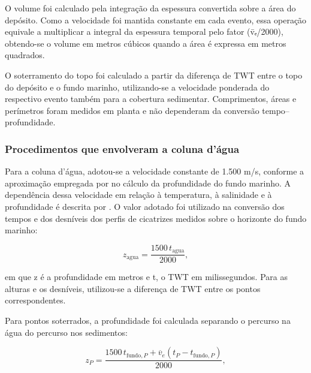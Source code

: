 O volume foi calculado pela integração da espessura convertida sobre a área do depósito. Como a velocidade foi mantida constante em cada evento, essa operação equivale a multiplicar a integral da espessura temporal pelo fator (v̄ₑ/2000), obtendo-se o volume em metros cúbicos quando a área é expressa em metros quadrados.

O soterramento do topo foi calculado a partir da diferença de TWT entre o topo do depósito e o fundo marinho, utilizando-se a velocidade ponderada do respectivo evento também para a cobertura sedimentar. Comprimentos, áreas e perímetros foram medidos em planta e não dependeram da conversão tempo--profundidade.

\subsubsection{Procedimentos que envolveram a coluna d’água}\label{sec:4-3-8-4}

Para a coluna d’água, adotou-se a velocidade constante de 1.500 m/s, conforme a aproximação empregada por  no cálculo da profundidade do fundo marinho. A dependência dessa velocidade em relação à temperatura, à salinidade e à profundidade é descrita por . O valor adotado foi utilizado na conversão dos tempos e dos desníveis dos perfis de cicatrizes medidos sobre o horizonte do fundo marinho:

\begin{equation}
  z_{\mathrm{agua}}=\frac{1500\,t_{\mathrm{agua}}}{2000},
  \label{eq:conversao-agua}
\end{equation}

\noindent
em que z é a profundidade em metros e t, o TWT em milissegundos. Para as alturas e os desníveis, utilizou-se a diferença de TWT entre os pontos correspondentes.

Para pontos soterrados, a profundidade foi calculada separando o percurso na água do percurso nos sedimentos:

\begin{equation}
  z_P=\frac{1500\,t_{\mathrm{fundo},P}+\overline{v}_e(t_P-t_{\mathrm{fundo},P})}{2000},
  \label{eq:profundidade-ponto}
\end{equation}

